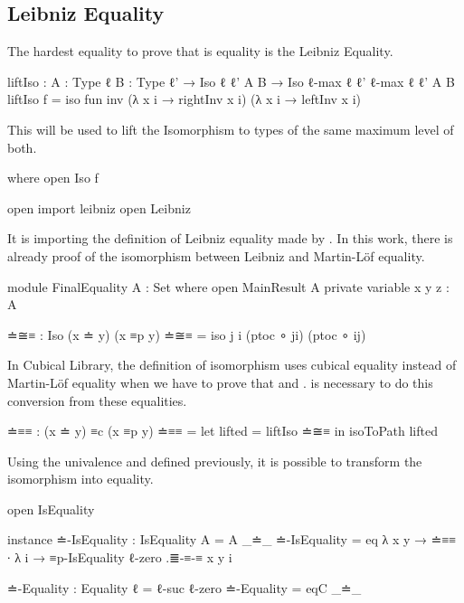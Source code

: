\documentclass{article}
\begin{document}
\subsection{Leibniz Equality}

The hardest equality to prove that is equality is the Leibniz Equality.

\begin{code}
liftIso : {A : Type ℓ} {B : Type ℓ'}
  → Iso {ℓ} {ℓ'} A B → Iso {ℓ-max ℓ ℓ'} {ℓ-max ℓ ℓ'} A B
liftIso f = iso fun inv
  (λ x i → rightInv x i) (λ x i → leftInv x i)
\end{code}

This  will be used to lift the Isomorphism to types of the same maximum level of both.

\begin{code}
  where open Iso f

open import leibniz
open Leibniz
\end{code}

It is importing the definition of Leibniz equality made by \cite{abel2020leibniz}.
In this work, there is already proof of the isomorphism between Leibniz and Martin-Löf equality.

\begin{code}
module FinalEquality {A : Set} where
  open MainResult A
  private variable
    x y z : A

  ≐≅≡ : Iso (x ≐ y) (x ≡p y)
  ≐≅≡ = iso j i (ptoc ∘ ji) (ptoc ∘ ij)
\end{code}

In Cubical Library, the definition of isomorphism uses cubical equality instead of Martin-Löf equality
when we have to prove that  and .
 is necessary to do this conversion from these equalities.

\begin{code}
  ≐≡≡ : (x ≐ y) ≡c (x ≡p y)
  ≐≡≡ = let lifted = liftIso ≐≅≡  in isoToPath lifted
\end{code}

Using the univalence and  defined previously, it is possible to transform the isomorphism
into equality.

\begin{code}
  open IsEquality

  instance
    ≐-IsEquality : IsEquality {A = A} _≐_
    ≐-IsEquality = eq λ {x} {y} → ≐≡≡ ∙
      λ i → ≡p-IsEquality {ℓ-zero} .≣-≡-≡ {x} {y} i

  ≐-Equality : Equality {ℓ = ℓ-suc ℓ-zero}
  ≐-Equality = eqC _≐_
\end{code}
\end{document}
